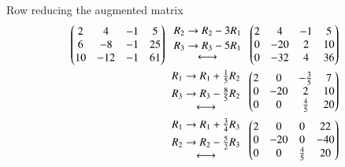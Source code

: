 \documentclass[journal,12pt,twocolumn]{IEEEtran}
\begin{document}
Row reducing the augmented matrix
\begin{align*}
    \begin{pmatrix} 2 & 4 & -1 & 5 \\ 6 & -8 & -1 & 25 \\ 10 & -12 & -1 & 61  \end{pmatrix} 
     \begin{array}{c}
     \genfrac{}{}{0pt}{0}{R_2 \rightarrow R_2 - 3 R_1}{R_3 \rightarrow R_3 - 5 R_1} \\  \longleftrightarrow
     \end{array}
    \begin{pmatrix} 2 & 4 & -1 & 5 \\ 0 & -20 & 2 & 10 \\ 0 & -32 & 4 & 36  \end{pmatrix} \\
    \begin{array}{c}
     \genfrac{}{}{0pt}{0}{R_1 \rightarrow R_1 + \frac{1}{5} R_2}{R_3 \rightarrow R_3 - \frac{8}{5} R_2} \\  \longleftrightarrow
     \end{array}
    \begin{pmatrix} 2 & 0 & -\frac{3}{5} & 7 \\ 0 & -20 & 2 & 10 \\ 0 & 0 & \frac{4}{5} & 20  \end{pmatrix} \\
    \begin{array}{c}
     \genfrac{}{}{0pt}{0}{R_1 \rightarrow R_1 + \frac{3}{4} R_3}{R_2 \rightarrow R_2 - \frac{5}{2} R_3} \\  \longleftrightarrow
     \end{array}
    \begin{pmatrix} 2 & 0 & 0 & 22 \\ 0 & -20 & 0 & -40 \\ 0 & 0 & \frac{4}{5} & 20  \end{pmatrix}
\end{align*}
\end{document}
